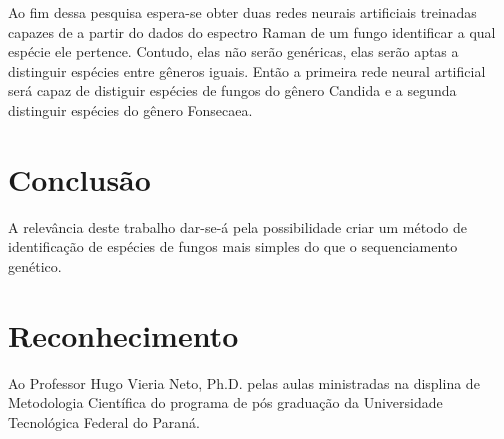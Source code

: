 \documentclass[conference,peerreview]{IEEEtran}
\begin{document}
Ao fim dessa pesquisa espera-se obter duas redes neurais artificiais treinadas capazes de a partir do dados do espectro Raman de um fungo identificar a qual espécie ele pertence. Contudo, elas não serão genéricas, elas serão aptas a distinguir espécies entre gêneros iguais. Então a primeira rede neural artificial será capaz de distiguir espécies de fungos do gênero Candida e a segunda distinguir espécies do gênero Fonsecaea. 

\section{Conclusão}
 
A relevância deste trabalho dar-se-á pela possibilidade criar um método de identificação de espécies de fungos mais simples do que o sequenciamento genético.

\section*{Reconhecimento}

Ao Professor Hugo Vieria Neto, Ph.D. pelas aulas ministradas na displina de Metodologia Científica do programa de pós graduação da Universidade Tecnológica Federal do Paraná.



\end{document}
